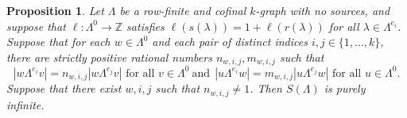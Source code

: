 \documentclass[a4paper, 12pt]{amsart}
\numberwithin{equation}{section}
\newcounter{theorem}
\newtheorem{prop}[theorem]{Proposition}
\theoremstyle{remark}
\theoremstyle{definition}
\begin{document}
\begin{prop}\label{prop.properties.dichotomy.three.part.two}
Let $\Lambda$ be a row-finite and cofinal $k$-graph with no sources, and suppose that
$\ell \colon \Lambda^0\to {\mathbb{Z}}$ satisfies $\ell(s(\lambda))=1+\ell(r(\lambda))$ for all
$\lambda\in\Lambda^{e_i}$. Suppose that for each $w \in \Lambda^0$ and each pair of
distinct indices $i, j \in \{1, \dots, k\}$, there are strictly positive rational numbers
$n_{w,i,j}, m_{w,i,j}$ such that
\begin{equation}\label{eqn.indepndent}
|w\Lambda^{e_i}v| = n_{w,i,j}|w\Lambda^{e_j}v|\text{ for all $v \in \Lambda^0$}\ \text{and}\ \ |u\Lambda^{e_i}w| = m_{w,i,j}|u\Lambda^{e_j}w|\text{ for all $u \in \Lambda^0$.}
\end{equation}
Suppose that there exist $w,i,j$ such that $n_{w,i,j} \not= 1$. Then $S(\Lambda)$ is
purely infinite.
\end{prop}
\end{document}
